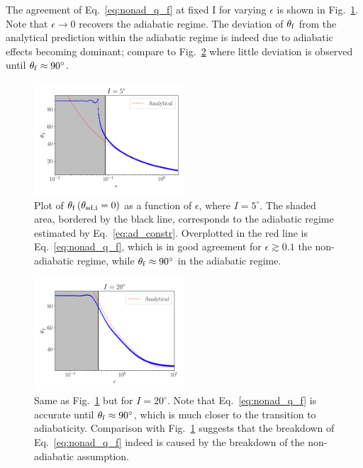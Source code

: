 \documentclass[
        fleqn,
        usenatbib,
    ]{mnras}
\newcommand*{\p}[1]{\left(#1\right)}
\begin{document}
The agreement of Eq.~\eqref{eq:nonad_q_f} at fixed I for varying $\epsilon$ is
shown in Fig.~\ref{fig:nonad_3_scan}. Note that $\epsilon \to 0$ recovers the
adiabatic regime. The deviation of $\theta_{\rm f}$ from the analytical
prediction within the adiabatic regime is indeed due to adiabatic effects
becoming dominant; compare to Fig.~\ref{fig:nonad_3_scan_20} where little
deviation is observed until $\theta_{\rm f} \approx 90^\circ$.
\begin{figure}
    \centering
    \includegraphics[width=0.5\textwidth]{plots_diskdisp/3scan.png}
    \caption{Plot of $\theta_{\rm  f}\p{\theta_{\rm sd, i} = 0}$ as a function
    of $\epsilon$, where $I = 5^\circ$. The shaded area, bordered by the black
    line, corresponds to the adiabatic regime estimated by
    Eq.~\eqref{eq:ad_constr}. Overplotted in the red line is
    Eq.~\eqref{eq:nonad_q_f}, which is in good agreement for $\epsilon \gtrsim
    0.1$ the non-adiabatic regime, while $\theta_{\rm f} \approx 90^\circ$ in
    the adiabatic regime.}\label{fig:nonad_3_scan}
\end{figure}
\begin{figure}
    \centering
    \includegraphics[width=0.5\textwidth]{plots_diskdisp/3scan_20.png}
    \caption{Same as Fig.~\ref{fig:nonad_3_scan} but for $I=20^\circ$. Note that
    Eq.~\eqref{eq:nonad_q_f} is accurate until $\theta_{\rm f} \approx 90^\circ$,
    which is much closer to the transition to adiabaticity. Comparison with
    Fig.~\ref{fig:nonad_3_scan} suggests that the breakdown of
    Eq.~\eqref{eq:nonad_q_f} indeed is caused by the breakdown of the
    non-adiabatic assumption.}\label{fig:nonad_3_scan_20}
\end{figure}
\end{document}
